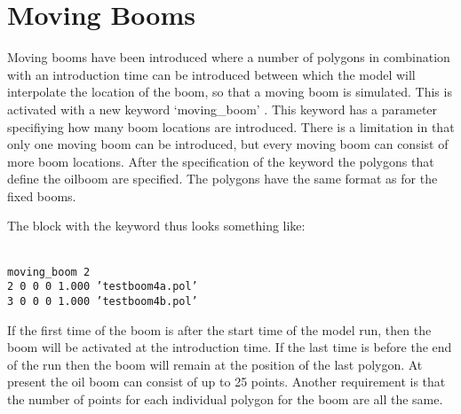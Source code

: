 \documentclass[english]{deltares_manual}
\begin{document}
\section{Moving Booms}
Moving booms have been introduced where a number of polygons in combination with an introduction time can be introduced between which the model will interpolate the location of the boom, so that a moving boom is simulated. This is activated with a new keyword ‘moving\_boom’ . This keyword has a parameter specifiying how many boom locations are introduced. There is a limitation in that only one moving boom can be introduced, but every moving boom can consist of more boom locations. 
After the specification of the keyword the polygons that define the oilboom are specified. The polygons have the same format as for the fixed booms.

The block with the keyword thus looks something like:
\begin{tcolorbox}
	\footnotesize
	\texttt{\\
moving\_boom 2   \\
2 0 0 0  1.000 'testboom4a.pol' \\
3 0 0 0  1.000 'testboom4b.pol' \\
}
\end{tcolorbox}

If the first time of the boom is after the start time of the model run, then the boom will be activated at the introduction time. If the last time is before the end of the run then the boom will remain at the position of the last polygon. At present the oil boom can consist of up to 25 points. Another requirement is that the number of points for each individual polygon for the boom are all the same. 
\end{document}
